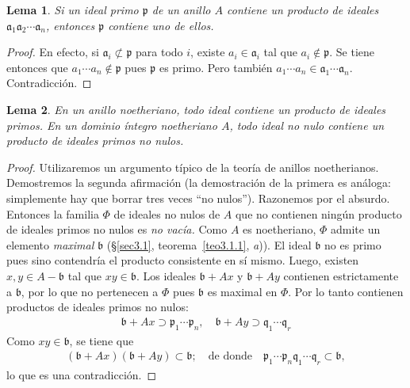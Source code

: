 \documentclass[10pt,oneside,bibtotoc,smallheadings,leqno,a5paper,DIV=12]{scrbook}
\newcommand{\idl}[1]{\mathfrak{#1}}
\numberwithin{equation}{section}
\theoremstyle{defi}
\theoremstyle{enonce}
\newtheorem{lemma}{Lema}
\theoremstyle{rem}
\numberwithin{theorem}{section}
\numberwithin{proposition}{section}
\numberwithin{definition}{section}
\numberwithin{lemma}{section}
\numberwithin{corollary}{section}
\numberwithin{example}{section}
\numberwithin{footnote}{section}%
\begin{document}
\begin{lemma}\label{lem3.3.2}
Si un ideal primo $\idl{p}$ de un anillo $A$ contiene un producto de ideales
$\idl{a}_{1}\idl{a}_{2}\cdots\idl{a}_{n}$, entonces $\idl{p}$ contiene uno de ellos.
\end{lemma}

\begin{proof}
En efecto, si $\idl{a}_{i}\not\subset\idl{p}$ para todo $i$, existe $a_{i}\in\idl{a}_{i}$ tal que
$a_{i}\notin\idl{p}$. Se tiene entonces que $a_{1}\cdots a_{n}\notin\idl{p}$ pues $\idl{p}$
es primo. Pero tambi\'en $a_{1}\cdots a_{n}\in\idl{a}_{1}\cdots\idl{a}_{n}$. Contradicci\'on.
\end{proof}

\begin{lemma}\label{lem3.3.3}
En un anillo noetheriano, todo ideal contiene un producto de ideales primos. En un dominio \'integro noetheriano
$A$, todo ideal no nulo contiene un producto de ideales primos no nulos.
\end{lemma}

\begin{proof}
Utilizaremos un argumento t\'ipico de la teor\'ia de anillos noetherianos. Demostremos la segunda
afirmaci\'on (la demostraci\'on de la primera es an\'aloga: simplemente hay que borrar tres
veces ``no nulos''). Razonemos por el absurdo. Entonces la familia $\Phi$ de ideales no nulos de $A$ que
no contienen ning\'un producto de ideales primos no nulos es {\em no vac\'ia.} Como $A$ es noetheriano,
$\Phi$ admite un elemento {\em maximal} $\idl{b}$ (\S\ref{sec3.1}, teorema~\ref{teo3.1.1}, {\itshape a})).
El ideal $\idl{b}$ no es primo pues
sino contendr\'ia el producto consistente en s\'i mismo. Luego, existen $x, y\in A-\idl{b}$ tal que
$xy\in\idl{b}$. Los ideales $\idl{b}+Ax$ y $\idl{b}+Ay$ contienen estrictamente a $\idl{b}$, por lo que
no pertenecen a $\Phi$ pues $\idl{b}$ es maximal en $\Phi$. Por lo tanto contienen productos de ideales
primos no nulos:
\begin{gather*}
\idl{b}+Ax\supset\idl{p}_{1}\cdots\idl{p}_{n},\quad\idl{b}+Ay\supset\idl{q}_{1}\cdots\idl{q}_{r}
\end{gather*}
Como $xy\in\idl{b}$, se tiene que
\begin{gather*}
(\idl{b}+Ax)(\idl{b}+Ay)\subset\idl{b};\quad\text{de donde}\quad\idl{p}_{1}\cdots\idl{p}_{n}\idl{q}_{1}\cdots
\idl{q}_{r}\subset\idl{b},
\end{gather*}
lo que es una contradicci\'on.
\end{proof}
\end{document}
